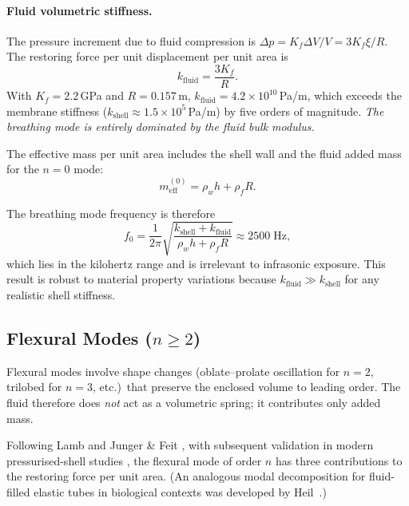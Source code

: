 \paragraph{Fluid volumetric stiffness.}
The pressure increment due to fluid compression is $\Delta p = K_f \Delta V /
V = 3K_f \xi / R$.  The restoring force per unit displacement per unit area is
\begin{equation}\label{eq:kfluid}
  k_\mathrm{fluid} = \frac{3K_f}{R}.
\end{equation}
With $K_f = 2.2$\,GPa and $R = 0.157$\,m, $k_\mathrm{fluid} = 4.2 \times
10^{10}$\,Pa/m, which exceeds the membrane stiffness ($k_\mathrm{shell}
\approx 1.5 \times 10^5$\,Pa/m) by five orders of magnitude.  \emph{The
breathing mode is entirely dominated by the fluid bulk modulus.}

The effective mass per unit area includes the shell wall and the fluid added
mass for the $n = 0$ mode:
\begin{equation}\label{eq:m0}
  m_\mathrm{eff}^{(0)} = \rho_w h + \rho_f R.
\end{equation}

The breathing mode frequency is therefore
\begin{equation}\label{eq:f0}
  f_0 = \frac{1}{2\pi}\sqrt{\frac{k_\mathrm{shell} + k_\mathrm{fluid}}
  {\rho_w h + \rho_f R}} \approx 2500\;\text{Hz},
\end{equation}
which lies in the kilohertz range and is irrelevant to infrasonic exposure.
This result is robust to material property variations because $k_\mathrm{fluid}
\gg k_\mathrm{shell}$ for any realistic shell stiffness.


\subsection{Flexural Modes (\texorpdfstring{$n \geq 2$}{n >= 2})}\label{sec:flexural}

Flexural modes involve shape changes (oblate--prolate oscillation for $n = 2$,
trilobed for $n = 3$, etc.)\ that preserve the enclosed volume to leading
order.  The fluid therefore does \emph{not} act as a volumetric spring; it
contributes only added mass.

Following Lamb \cite{lamb1882} and Junger \& Feit
\cite{Junger1986}, with subsequent validation in modern pressurised-shell
studies \cite{Kuo2015,Ghaheri2022}, the flexural mode of order $n$ has three contributions
to the restoring force per unit area.  (An analogous modal decomposition
for fluid-filled elastic tubes in biological contexts was developed by
Heil~\cite{Heil1996}.)

